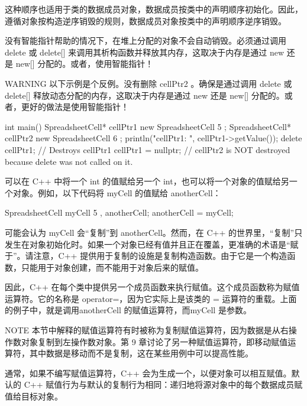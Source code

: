 这种顺序也适用于类的数据成员对象，数据成员按类中的声明顺序初始化。因此，遵循对象按构造逆序销毁的规则，数据成员对象按类中的声明顺序逆序销毁。

没有智能指针帮助的情况下，在堆上分配的对象不会自动销毁。必须通过调用 delete 或 delete[] 来调用其析构函数并释放其内存，这取决于内存是通过 new 还是 new[] 分配的。或者，使用智能指针！

\begin{myWarning}{WARNING}
以下示例是个反例。没有删除 cellPtr2 。确保是通过调用 delete 或 delete[] 释放动态分配的内存，这取决于内存是通过 new 还是 new[] 分配的。或者，更好的做法是使用智能指针！
\end{myWarning}

\begin{cpp}
int main()
{
    SpreadsheetCell* cellPtr1 { new SpreadsheetCell { 5 } };
    SpreadsheetCell* cellPtr2 { new SpreadsheetCell { 6 } };
    println("cellPtr1: {}", cellPtr1->getValue());
    delete cellPtr1; // Destroys cellPtr1
    cellPtr1 = nullptr;
} // cellPtr2 is NOT destroyed because delete was not called on it.
\end{cpp}


可以在 C++ 中将一个 int 的值赋给另一个 int，也可以将一个对象的值赋给另一个对象。例如，以下代码将 myCell 的值赋给 anotherCell：

\begin{cpp}
SpreadsheetCell myCell { 5 }, anotherCell;
anotherCell = myCell;
\end{cpp}

可能会认为 myCell 会“复制”到 anotherCell。然而，在 C++ 的世界里，“复制”只发生在对象初始化时。如果一个对象已经有值并且正在覆盖，更准确的术语是“赋于”。请注意，C++ 提供用于复制的设施是复制构造函数。由于它是一个构造函数，只能用于对象创建，而不能用于对象后来的赋值。

因此，C++ 在每个类中提供另一个成员函数来执行赋值。这个成员函数称为赋值运算符。它的名称是 operator=，因为它实际上是该类的 = 运算符的重载。上面的例子中，就是调用anotherCell 的赋值运算符，而myCell 是参数。

\begin{myNotic}{NOTE}
本节中解释的赋值运算符有时被称为复制赋值运算符，因为数据是从右操作数对象复制到左操作数对象。第 9 章讨论了另一种赋值运算符，即移动赋值运算符，其中数据是移动而不是复制，这在某些用例中可以提高性能。
\end{myNotic}

通常，如果不编写赋值运算符，C++ 会为生成一个，以便对象可以相互赋值。默认的 C++ 赋值行为与默认的复制行为相同：递归地将源对象中的每个数据成员赋值给目标对象。

